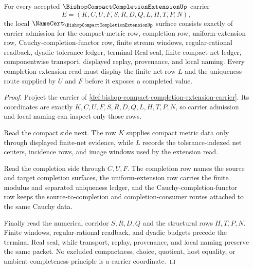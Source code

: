 \begin{theorem}
\label{thm:bishop-compact-completion-extension-namecert-obligations}
For every accepted $\BishopCompactCompletionExtensionUp$ carrier
$$
E=(K,C,U,F,S,R,D,Q,L,H,T,P,N),
$$
the local $\NameCert_{\BishopCompactCompletionExtensionUp}$ surface consists
exactly of carrier admission for the compact-metric row, completion row,
uniform-extension row, Cauchy-completion-functor row, finite stream windows,
regular-rational readback, dyadic tolerance ledger, terminal Real seal,
finite compact-net ledger, componentwise transport, displayed replay,
provenance, and local naming. Every completion-extension read must display
the finite-net row $L$ and the uniqueness route supplied by $U$ and $F$ before
it exposes a completed value.
\end{theorem}
\begin{proof}
Project the carrier of
\autoref{def:bishop-compact-completion-extension-carrier}. Its coordinates are
exactly $K,C,U,F,S,R,D,Q,L,H,T,P,N$, so carrier admission and local naming can
inspect only those rows.

Read the compact side next. The row $K$ supplies compact metric data only
through displayed finite-net evidence, while $L$ records the tolerance-indexed
net centers, incidence rows, and image windows used by the extension read.

Read the completion side through $C,U,F$. The completion row names the source
and target completion surfaces, the uniform-extension row carries the finite
modulus and separated uniqueness ledger, and the Cauchy-completion-functor row
keeps the source-to-completion and completion-consumer routes attached to the
same Cauchy data.

Finally read the numerical corridor $S,R,D,Q$ and the structural rows $H,T,P,N$.
Finite windows, regular-rational readback, and dyadic budgets precede the
terminal Real seal, while transport, replay, provenance, and local naming
preserve the same packet. No excluded compactness, choice, quotient, host
equality, or ambient completeness principle is a carrier coordinate.
\end{proof}

